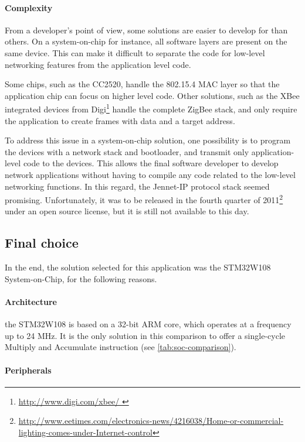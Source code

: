 \paragraph{Complexity} 

From a developer's point of view, some solutions are easier to develop for than
others. On a system-on-chip for instance, all software layers are present on the
same device. This can make it difficult to separate the code for low-level
networking features from the application level code.

Some chips, such as the CC2520, handle the 802.15.4 MAC layer so that the
application chip can focus on higher level code. Other solutions, such as the
XBee integrated devices from Digi\footnote{ \url{ http://www.digi.com/xbee/ }}
handle the complete ZigBee stack, and only require the application to create
frames with data and a target address.

To address this issue in a system-on-chip solution, one possibility is to
program the devices with a network stack and bootloader, and transmit only
application-level code to the devices. This allows the final software developer
to develop network applications without having to compile any code related to
the low-level networking functions. In this regard, the Jennet-IP protocol stack
seemed promising. Unfortunately, it was to be released in the fourth quarter of
2011\footnote{ \url{
http://www.eetimes.com/electronics-news/4216038/Home-or-commercial-lighting-comes-under-Internet-control}
} under an open source license, but it is still not available to this day.

\subsection{Final choice}

In the end, the solution selected for this application was the STM32W108
System-on-Chip, for the following reasons.

\paragraph{Architecture}

the STM32W108 is based on a 32-bit ARM core, which
operates at a frequency up to 24 MHz. It is the only solution in this comparison
to offer a single-cycle Multiply and Accumulate instruction (see
\autoref{tab:soc-comparison}).

\paragraph{Peripherals} 

